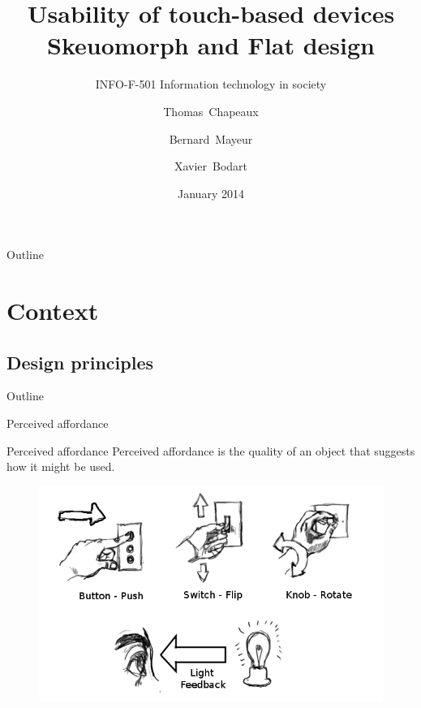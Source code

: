 \documentclass{beamer}
\title{Usability of touch-based devices \\ Skeuomorph and Flat design}
\subtitle {INFO-F-501 Information technology in society}
\author{Thomas~Chapeaux  \and Bernard~Mayeur \and Xavier~Bodart }
\institute[shortinst]{Université Libre de Bruxelles \\ Belgium}
\date{January 2014}
\begin{document}
\maketitle{}

\begin{frame}{Outline}
    \tableofcontents
\end{frame}

\section{Context}

\subsection{Design principles}

\begin{frame}{Outline}
    \tableofcontents[currentsection]
\end{frame}



\begin{frame}{Perceived affordance}
	\begin{block}{Perceived affordance}
	Perceived affordance is the quality of an object that suggests how it might be used.
	\end{block}
	\begin{figure}[ht]
	\includegraphics[scale=0.3]{switches.png}
	\end{figure}
\end{frame}
\end{document}
